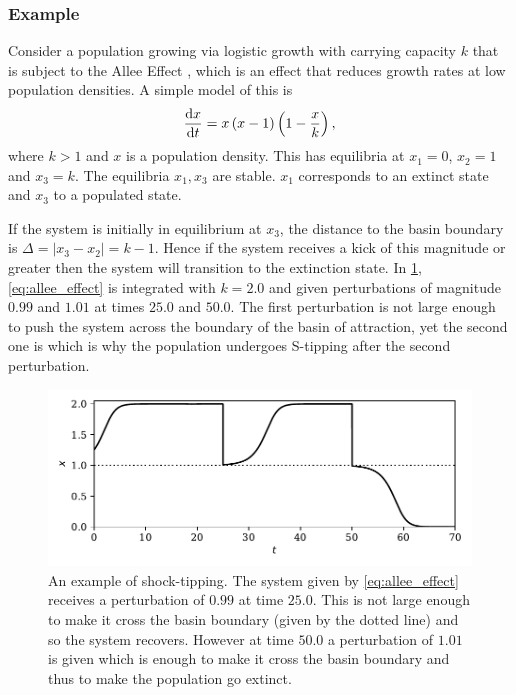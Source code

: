 \subsubsection{Example}
Consider a population growing via logistic growth with carrying capacity $k$ that is subject to the Allee Effect \parencite{Allee1932,Stephens1999}, which is an effect that reduces
growth rates at low population densities. A simple model of this is
\begin{equation}
  \label{eq:allee_effect}
  \dv{x}{t} = x\left(x-1\right)\left(1-\frac{x}{k}\right),
\end{equation}
where $k > 1$ and $x$ is a population density. This has equilibria at $x_1 = 0$, $x_2 = 1$ and $x_3 = k$. The equilibria $x_1,x_3$ are stable. $x_1$ corresponds to an extinct
state and $x_3$ to a populated state.

If the system is initially in equilibrium at $x_3$, the distance to the basin boundary is $\Delta = |x_3 - x_2| = k - 1$. Hence if the system receives a kick of
this magnitude or greater then the system will transition to the extinction state. In \cref{fig:shock_tipping}, \cref{eq:allee_effect} is integrated with $k = 2.0$ and given perturbations of
magnitude $0.99$ and $1.01$ at times $25.0$ and $50.0$. The first perturbation is not large enough to push the system across the boundary of the basin of attraction, yet the second one is
which is why the population undergoes S-tipping after the second perturbation.

\begin{figure}
  \centering
  \includegraphics[width=\textwidth,keepaspectratio]{shock}
  \caption{An example of shock-tipping. The system given by \cref{eq:allee_effect} receives a perturbation of $0.99$ at time $25.0$. This is not large enough to make it cross the basin boundary
    (given by the dotted line) and so the system recovers. However at time $50.0$ a perturbation of $1.01$ is given which is enough to make it cross the basin boundary and thus to make the
  population go extinct.}
  \label{fig:shock_tipping}
\end{figure}

